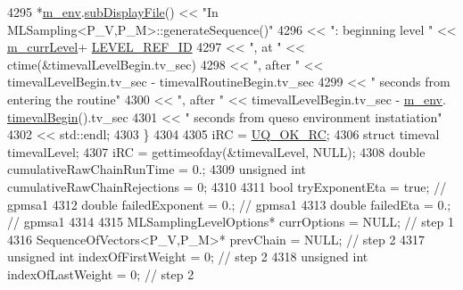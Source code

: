 \begin{DoxyCode}
{4295       *\hyperlink{class_q_u_e_s_o_1_1_m_l_sampling_a13f1ca4fe9f94822fe572a743eaced1d}{m\_env}.\hyperlink{class_q_u_e_s_o_1_1_base_environment_a8a0064746ae8dddfece4229b9ad374d6}{subDisplayFile}() << \textcolor{stringliteral}{"In MLSampling<P\_V,P\_M>::generateSequence()"}
4296                               << \textcolor{stringliteral}{": beginning level "} << \hyperlink{class_q_u_e_s_o_1_1_m_l_sampling_af9416874c856e50f3b35270e801f17e4}{m\_currLevel}+
      \hyperlink{_m_l_sampling_level_options_8h_a68d15eaf394d210effcf584b938206d3}{LEVEL\_REF\_ID}
4297                               << \textcolor{stringliteral}{", at  "}   << ctime(&timevalLevelBegin.tv\_sec)
4298                               << \textcolor{stringliteral}{", after "} << timevalLevelBegin.tv\_sec - timevalRoutineBegin.tv\_sec
4299                               << \textcolor{stringliteral}{" seconds from entering the routine"}
4300                               << \textcolor{stringliteral}{", after "} << timevalLevelBegin.tv\_sec - \hyperlink{class_q_u_e_s_o_1_1_m_l_sampling_a13f1ca4fe9f94822fe572a743eaced1d}{m\_env}.
      \hyperlink{class_q_u_e_s_o_1_1_base_environment_a1adcf7ca2d95e75a29360bcfe091cd65}{timevalBegin}().tv\_sec
4301                               << \textcolor{stringliteral}{" seconds from queso environment instatiation"}
4302                               << std::endl;
4303     \}
4304 
4305     iRC = \hyperlink{namespace_q_u_e_s_o_a8e909502900aecf24cedba022ea84471}{UQ\_OK\_RC};
4306     \textcolor{keyword}{struct }timeval timevalLevel;
4307     iRC = gettimeofday(&timevalLevel, NULL);
4308     \textcolor{keywordtype}{double}       cumulativeRawChainRunTime    = 0.;
4309     \textcolor{keywordtype}{unsigned} \textcolor{keywordtype}{int} cumulativeRawChainRejections = 0;
4310 
4311     \textcolor{keywordtype}{bool}   tryExponentEta = \textcolor{keyword}{true}; \textcolor{comment}{// gpmsa1}
4312     \textcolor{keywordtype}{double} failedExponent = 0.;   \textcolor{comment}{// gpmsa1}
4313     \textcolor{keywordtype}{double} failedEta      = 0.;   \textcolor{comment}{// gpmsa1}
4314 
4315     MLSamplingLevelOptions*            currOptions           = NULL;  \textcolor{comment}{// step 1}
4316     SequenceOfVectors<P\_V,P\_M>*        prevChain             = NULL;  \textcolor{comment}{// step 2}
4317     \textcolor{keywordtype}{unsigned} \textcolor{keywordtype}{int}                              indexOfFirstWeight    = 0;     \textcolor{comment}{// step 2}
4318     \textcolor{keywordtype}{unsigned} \textcolor{keywordtype}{int}                              indexOfLastWeight     = 0;     \textcolor{comment}{// step 2}
}
\end{DoxyCode}
